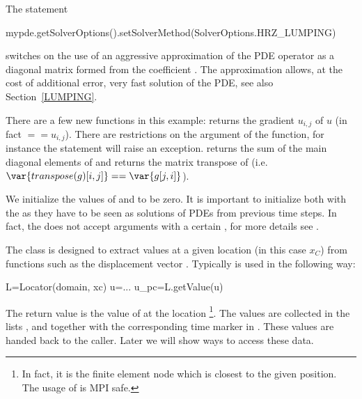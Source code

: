 The statement
\begin{python}
  mypde.getSolverOptions().setSolverMethod(SolverOptions.HRZ_LUMPING) 
\end{python}
switches on the use of an aggressive approximation of the PDE operator as a
diagonal matrix formed from the coefficient .
The approximation allows, at the cost of additional error, very fast solution
of the PDE, see also Section~\ref{LUMPING}.

There are a few new \escript functions in this example: 
 returns the gradient $u_{i,j}$ of $u$ (in fact $==u_{i,j}$).
There are restrictions on the argument of the  function, for
instance the statement  will raise an exception.
 returns the sum of the main diagonal elements  of
 and  returns the matrix transpose of  (i.e.
$\var{transpose(g)[i,j]}==\var{g[j,i]}$). 

We initialize the values of  and  to be zero.
It is important to initialize both with the \SolutionFS as they have to be
seen as solutions of PDEs from previous time steps.
In fact, the  does not accept arguments with a certain
\FunctionSpace, for more details see . 

The  class is designed to extract values at a given location
(in this case $x_C$) from functions such as the displacement vector .
Typically  is used in the following way:
\begin{python}
  L=Locator(domain, xc)
  u=...
  u_pc=L.getValue(u)
\end{python}
The return value  is the value of  at the location
\footnote{In fact, it is the finite element node which is closest to
the given position. The usage of  is MPI safe.}.
The values are collected in the lists ,  and 
together with the corresponding time marker in .
These values are handed back to the caller. Later we will show ways to access these data.

